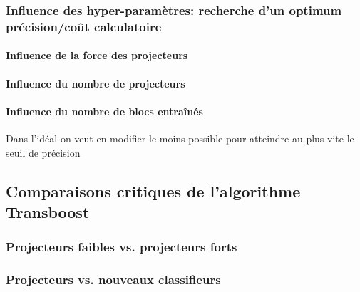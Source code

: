 \documentclass[11 pt]{article}
\begin{document}
\subsubsection{Influence des hyper-paramètres: recherche d'un optimum précision/coût calculatoire}
\paragraph{Influence de la force des projecteurs}
\paragraph{Influence du nombre de projecteurs}
\paragraph{Influence du nombre de blocs entraînés}
Dans l’idéal on veut en modifier le moins possible pour atteindre au plus vite le seuil de précision

\subsection{Comparaisons critiques de l'algorithme Transboost}
\subsubsection{Projecteurs faibles vs. projecteurs forts}
\subsubsection{Projecteurs vs. nouveaux classifieurs}
\paragraph{}

\bigskip
\nocite{*}


\end{document}
